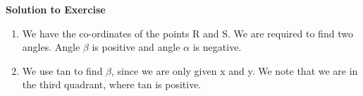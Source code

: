 {\begin{mdframed}[linewidth=4, leftmargin=40, rightmargin=40]
\begin{exercise}
    \addtocounter{footnote}{-0}
    
        \par 
        
        \vspace{5pt}
        \label{m39411*solfhsst!!!underscore!!!id194}\noindent\textbf{Solution to Exercise } \label{m39411*listfhsst!!!underscore!!!id194}\begin{enumerate}[noitemsep, label=\textbf{Step} \textbf{\arabic*}. ] 
            \leftskip=20pt\rightskip=\leftskip\item  
        \label{m39411*id81936}We have the co-ordinates of the points R and S. We are required to find two angles. Angle \begin{math}\beta \end{math} is positive and angle \begin{math}\alpha \end{math} is negative.\par 
        \item  
        \label{m39411*id8267}We use tan to find \begin{math}\beta \end{math}, since we are only given x and y. We note that we are in the third quadrant, where tan is positive.\par 
        \label{m39411*id82128}\nopagebreak\noindent{}
\end{enumerate}
\end{exercise}
\end{mdframed}}
